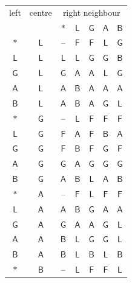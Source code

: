 \begin{table}[p]
\centering\small
\begin{tabular}{@{}cc|ccccc@{}}
\toprule
left & centre & \multicolumn{5}{c}{right neighbour}\\
 & & $\ast$ & $\mathsf{L}$ & $\mathsf{G}$ & $\mathsf{A}$ & $\mathsf{B}$\\
\midrule
$\ast$ & $\mathsf{L}$ & -- & $\mathsf{F}$ & $\mathsf{F}$ & $\mathsf{L}$ & $\mathsf{G}$\\
$\mathsf{L}$ & $\mathsf{L}$ & $\mathsf{L}$ & $\mathsf{L}$ & $\mathsf{G}$ & $\mathsf{G}$ & $\mathsf{B}$\\
$\mathsf{G}$ & $\mathsf{L}$ & $\mathsf{G}$ & $\mathsf{A}$ & $\mathsf{A}$ & $\mathsf{L}$ & $\mathsf{G}$\\
$\mathsf{A}$ & $\mathsf{L}$ & $\mathsf{A}$ & $\mathsf{B}$ & $\mathsf{A}$ & $\mathsf{A}$ & $\mathsf{A}$\\
$\mathsf{B}$ & $\mathsf{L}$ & $\mathsf{A}$ & $\mathsf{B}$ & $\mathsf{A}$ & $\mathsf{G}$ & $\mathsf{L}$\\
\midrule
$\ast$ & $\mathsf{G}$ & -- & $\mathsf{L}$ & $\mathsf{F}$ & $\mathsf{F}$ & $\mathsf{F}$\\
$\mathsf{L}$ & $\mathsf{G}$ & $\mathsf{F}$ & $\mathsf{A}$ & $\mathsf{F}$ & $\mathsf{B}$ & $\mathsf{A}$\\
$\mathsf{G}$ & $\mathsf{G}$ & $\mathsf{F}$ & $\mathsf{B}$ & $\mathsf{F}$ & $\mathsf{G}$ & $\mathsf{F}$\\
$\mathsf{A}$ & $\mathsf{G}$ & $\mathsf{G}$ & $\mathsf{A}$ & $\mathsf{G}$ & $\mathsf{G}$ & $\mathsf{G}$\\
$\mathsf{B}$ & $\mathsf{G}$ & $\mathsf{A}$ & $\mathsf{B}$ & $\mathsf{L}$ & $\mathsf{A}$ & $\mathsf{B}$\\
\midrule
$\ast$ & $\mathsf{A}$ & -- & $\mathsf{F}$ & $\mathsf{L}$ & $\mathsf{F}$ & $\mathsf{F}$\\
$\mathsf{L}$ & $\mathsf{A}$ & $\mathsf{A}$ & $\mathsf{B}$ & $\mathsf{G}$ & $\mathsf{A}$ & $\mathsf{A}$\\
$\mathsf{G}$ & $\mathsf{A}$ & $\mathsf{G}$ & $\mathsf{A}$ & $\mathsf{A}$ & $\mathsf{G}$ & $\mathsf{L}$\\
$\mathsf{A}$ & $\mathsf{A}$ & $\mathsf{B}$ & $\mathsf{L}$ & $\mathsf{G}$ & $\mathsf{G}$ & $\mathsf{L}$\\
$\mathsf{B}$ & $\mathsf{A}$ & $\mathsf{B}$ & $\mathsf{L}$ & $\mathsf{B}$ & $\mathsf{L}$ & $\mathsf{B}$\\
\midrule
$\ast$ & $\mathsf{B}$ & -- & $\mathsf{L}$ & $\mathsf{F}$ & $\mathsf{F}$ & $\mathsf{L}$\\

\end{tabular}
\end{table}

